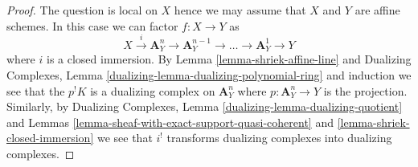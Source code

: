\documentclass[10pt,a4paper]{amsart}
\theoremstyle{plain}
\theoremstyle{definition}
\theoremstyle{remark}
\numberwithin{equation}{subsection}
\begin{document}
\begin{proof}
The question is local on $X$ hence we may assume that $X$ and $Y$ are
affine schemes. In this case we can factor $f : X \to Y$ as
$$
X \xrightarrow{i} \mathbf{A}^n_Y \to \mathbf{A}^{n - 1}_Y \to \ldots \to
\mathbf{A}^1_Y \to Y
$$
where $i$ is a closed immersion. By Lemma \ref{lemma-shriek-affine-line} and
Dualizing Complexes, Lemma \ref{dualizing-lemma-dualizing-polynomial-ring}
and induction we see that
the $p^!K$ is a dualizing complex on $\mathbf{A}^n_Y$ where
$p : \mathbf{A}^n_Y \to Y$ is the projection. Similarly, by
Dualizing Complexes, Lemma \ref{dualizing-lemma-dualizing-quotient}
and Lemmas
\ref{lemma-sheaf-with-exact-support-quasi-coherent} and
\ref{lemma-shriek-closed-immersion} we see that $i^!$
transforms dualizing complexes into dualizing complexes.
\end{proof}
\end{document}

